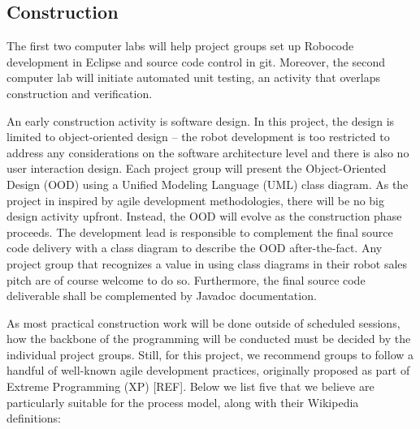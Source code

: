 \documentclass{scrreprt}
\begin{document}
\subsection{Construction} \label{sec:constr}
The first two computer labs will help project groups set up Robocode development in Eclipse and source code control in git. Moreover, the second computer lab will initiate automated unit testing, an activity that overlaps construction and verification.

An early construction activity is software design. In this project, the design is limited to object-oriented design -- the robot development is too restricted to address any considerations on the software architecture level and there is also no user interaction design. Each project group will present the Object-Oriented Design (OOD) using a Unified Modeling Language (UML) class diagram. As the project in inspired by agile development methodologies, there will be no big design activity upfront. Instead, the OOD will evolve as the construction phase proceeds. The development lead is responsible to complement the final source code delivery with a class diagram to describe the OOD after-the-fact. Any project group that recognizes a value in using class diagrams in their robot sales pitch are of course welcome to do so. Furthermore, the final source code deliverable shall be complemented by Javadoc documentation.  

As most practical construction work will be done outside of scheduled sessions, how the backbone of the programming will be conducted must be decided by the individual project groups. Still, for this project, we recommend groups to follow a handful of well-known agile development practices, originally proposed as part of Extreme Programming (XP) [REF]. Below we list five that we believe are particularly suitable for the process model, along with their Wikipedia definitions:
\end{document}
